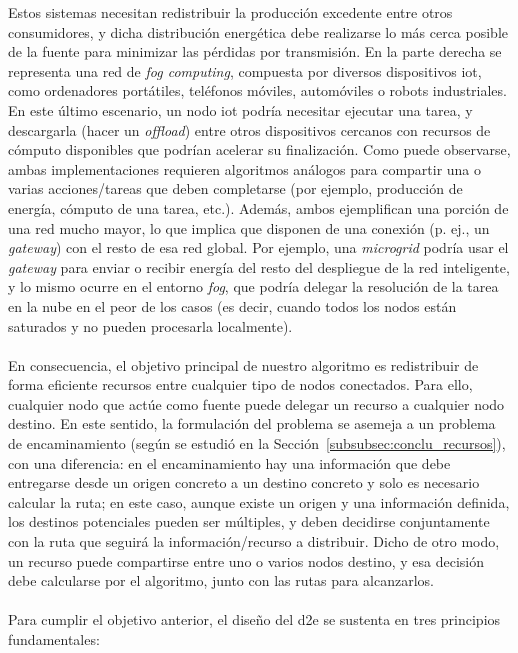 Estos sistemas necesitan redistribuir la producción excedente entre otros consumidores, y dicha distribución energética debe realizarse lo más cerca posible de la fuente para minimizar las pérdidas por transmisión. En la parte derecha se representa una red de \textit{fog computing}, compuesta por diversos dispositivos \gls{iot}, como ordenadores portátiles, teléfonos móviles, automóviles o robots industriales. En este último escenario, un nodo \gls{iot} podría necesitar ejecutar una tarea, y descargarla (hacer un \textit{offload}) entre otros dispositivos cercanos con recursos de cómputo disponibles que podrían acelerar su finalización. Como puede observarse, ambas implementaciones requieren algoritmos análogos para compartir una o varias acciones/tareas que deben completarse (por ejemplo, producción de energía, cómputo de una tarea, etc.). Además, ambos ejemplifican una porción de una red mucho mayor, lo que implica que disponen de una conexión (p. ej., un \textit{gateway}) con el resto de esa red global. Por ejemplo, una \textit{microgrid} podría usar el \textit{gateway} para enviar o recibir energía del resto del despliegue de la red inteligente, y lo mismo ocurre en el entorno \textit{fog}, que podría delegar la resolución de la tarea en la nube en el peor de los casos (es decir, cuando todos los nodos están saturados y no pueden procesarla localmente).\\
\\
En consecuencia, el objetivo principal de nuestro algoritmo es redistribuir de forma eficiente recursos entre cualquier tipo de nodos conectados. Para ello, cualquier nodo que actúe como fuente puede delegar un recurso a cualquier nodo destino. En este sentido, la formulación del problema se asemeja a un problema de encaminamiento (según se estudió en la Sección~\ref{subsubsec:conclu_recursos}), con una diferencia: en el encaminamiento hay una información que debe entregarse desde un origen concreto a un destino concreto y solo es necesario calcular la ruta; en este caso, aunque existe un origen y una información definida, los destinos potenciales pueden ser múltiples, y deben decidirse conjuntamente con la ruta que seguirá la información/recurso a distribuir. Dicho de otro modo, un recurso puede compartirse entre uno o varios nodos destino, y esa decisión debe calcularse por el algoritmo, junto con las rutas para alcanzarlos.\\
\\
Para cumplir el objetivo anterior, el diseño del \gls{d2e} se sustenta en tres principios fundamentales:

